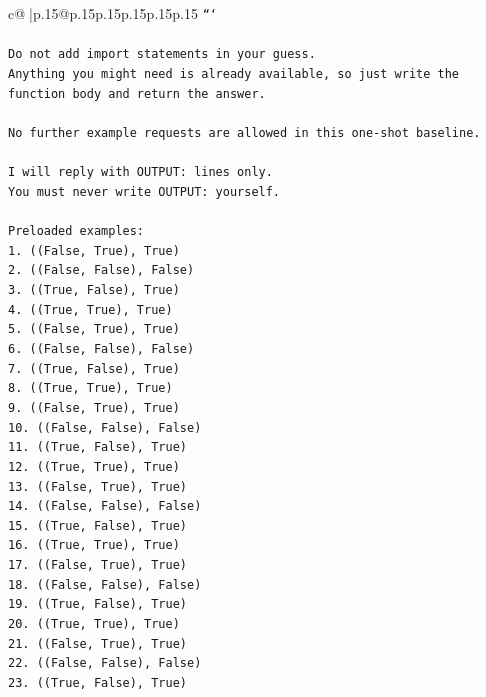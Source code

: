 \documentclass{article}
\begin{document}
{\begin{supertabular}{c@{$\;$}|p{.15\linewidth}@{}p{.15\linewidth}p{.15\linewidth}p{.15\linewidth}p{.15\linewidth}p{.15\linewidth}}
{{{\texttt{```} \\
\\ 
\texttt{Do not add import statements in your guess.} \\
\texttt{Anything you might need is already available, so just write the function body and return the answer.} \\
\\ 
\texttt{No further example requests are allowed in this one{-}shot baseline.} \\
\\ 
\texttt{I will reply with OUTPUT: lines only.} \\
\texttt{You must never write OUTPUT: yourself.} \\
\\ 
\texttt{Preloaded examples:} \\
\texttt{1. ((False, True), True)} \\
\texttt{2. ((False, False), False)} \\
\texttt{3. ((True, False), True)} \\
\texttt{4. ((True, True), True)} \\
\texttt{5. ((False, True), True)} \\
\texttt{6. ((False, False), False)} \\
\texttt{7. ((True, False), True)} \\
\texttt{8. ((True, True), True)} \\
\texttt{9. ((False, True), True)} \\
\texttt{10. ((False, False), False)} \\
\texttt{11. ((True, False), True)} \\
\texttt{12. ((True, True), True)} \\
\texttt{13. ((False, True), True)} \\
\texttt{14. ((False, False), False)} \\
\texttt{15. ((True, False), True)} \\
\texttt{16. ((True, True), True)} \\
\texttt{17. ((False, True), True)} \\
\texttt{18. ((False, False), False)} \\
\texttt{19. ((True, False), True)} \\
\texttt{20. ((True, True), True)} \\
\texttt{21. ((False, True), True)} \\
\texttt{22. ((False, False), False)} \\
\texttt{23. ((True, False), True)} \\
}}}
\end{supertabular}}
\end{document}

